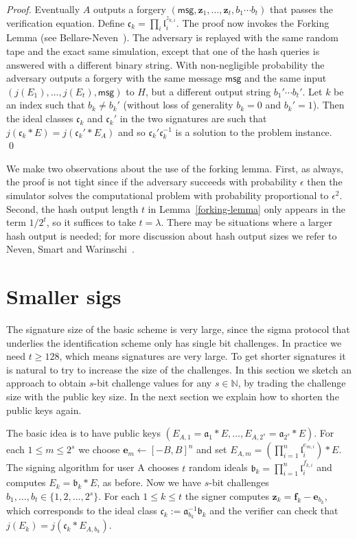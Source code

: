 \documentclass{llncs}
\newcommand{\N}{\mathbb{N}}
\newcommand{\msg}{\textsf{msg}}
\renewcommand{\a}{\mathfrak{a}}
\renewcommand{\b}{\mathfrak{b}}
\renewcommand{\c}{\mathfrak{c}}
\renewcommand{\l}{\mathfrak{l}}
\newcommand{\e}{\textbf{e}}
\newcommand{\f}{\textbf{f}}
\newcommand{\z}{\textbf{z}}
\begin{document}
\begin{proof}
\vskip 0.1cm

Eventually $A$ outputs a forgery $(\msg, \z_1, \dots, \z_t, b_1\cdots b_t)$ that passes the verification equation.
Define $\c_k = \prod_i \l_i^{z_{k,i}}$.
The proof now invokes the Forking Lemma (see Bellare-Neven~\cite{BN06}). The adversary is replayed with the same random tape and the exact same simulation, except that one of the hash queries is answered with a different binary string.
With non-negligible probability the adversary outputs a forgery with the same message $\msg$ and the same input $(j(E_1), \dots, j(E_t), \msg)$ to $H$, but a different output string $b_1'\cdots b_t'$. Let $k$ be an index such that $b_k \ne b_k'$ (without loss of generality $b_k = 0$ and $b_k' = 1$). Then the ideal classes $\c_k$ and $\c_k'$ in the two signatures are such that $j( \c_k * E ) = j( \c_k' * E_A )$ and so $\c_k' \c_k^{-1}$ is a solution to the problem instance. \qed
\end{proof}


We make two observations about the use of the forking lemma.
First, as always, the proof is not tight since if the adversary succeeds with probability $\epsilon$ then the simulator solves the computational problem with probability proportional to $\epsilon^2$.
Second, the hash output length $t$ in Lemma~\ref{forking-lemma} only appears in the term $1/2^t$, so it suffices to take $t = \lambda$.
There may be situations where a larger hash output is needed; for more discussion about hash output sizes we refer to Neven, Smart and Warinschi~\cite{NSW09}.





\section{Smaller sigs}\label{sec:smaller-sigs}


The signature size of the basic scheme is very large, since the sigma protocol that underlies the identification scheme only has single bit challenges. 
In practice we need $t \ge 128$, which means signatures are very large.
To get shorter signatures it is natural to try to increase the size of the challenges.
In this section we sketch an approach to obtain $s$-bit challenge values for any $s \in \N$, by trading the challenge size with the public key size. In the next section we explain how to shorten the public keys again.


The basic idea is to have public keys $( E_{A,1} = \a_1 * E , \dots , E_{A,2^s} = \a_{2^s} * E )$.
For each $1 \le m \le 2^s$ we choose $\e_m \leftarrow [-B,B]^n$ and set $E_{A,m} = ( \prod_{i=1}^n \l_i^{e_{m,i}} ) * E$.
The signing algorithm for user A chooses $t$ random ideals $\b_k = \prod_{i=1}^n \l_i^{f_{k,i}}$ and computes $E_k = \b_k * E$, as before.
Now we have $s$-bit challenges $b_1, \dots, b_t \in \{1, 2, \dots, 2^s \}$.
For each $1 \le k \le t$ the signer computes $\z_k = \f_k - \e_{b_k}$, which corresponds to the ideal class $\c_k := \a_{b_k}^{-1} \b_k$ and the verifier can check that $j( E_k ) = j( \c_k * E_{A, b_k})$.
\end{document}
